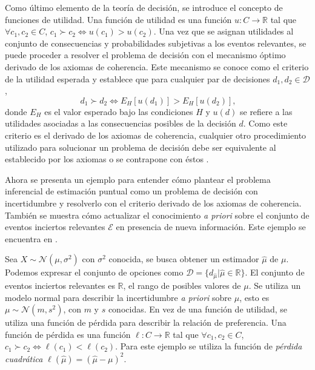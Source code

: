 \documentclass[11pt,a4paper]{article}
\begin{document}
Como último elemento de la teoría de decisión, se introduce el concepto de funciones de utilidad. Una función de utilidad es una función $u: C \to \mathbb{R}$ tal que $\forall c_1, c_2 \in C$, $c_1 \succ c_2 \iff u(c_1) > u(c_2)$. Una vez que se asignan utilidades al conjunto de consecuencias y probabilidades subjetivas a los eventos relevantes, se puede proceder a resolver el problema de decisión con el mecanismo óptimo derivado de los axiomas de coherencia. Este mecanismo se conoce como el criterio de la utilidad esperada y establece que para cualquier par de decisiones $d_1, d_2 \in \mathcal{D}$, $$ \ d_1 \succ d_2 \iff E_H[u(d_1)] > E_H[u(d_2)],$$ donde $E_H$ es el valor esperado bajo las condiciones $H$ y $u(d)$ se refiere a las utilidades asociadas a las consecuencias posibles de la decisión $d$. Como este criterio es el derivado de los axiomas de coherencia, cualquier otro procedimiento utilizado para solucionar un problema de decisión debe ser equivalente al establecido por los axiomas o se contrapone con éstos \citep{mendoza}.

Ahora se presenta un ejemplo para entender cómo plantear el problema inferencial de estimación puntual como un problema de decisión con incertidumbre y resolverlo con el criterio derivado de los axiomas de coherencia. También se muestra cómo actualizar el conocimiento \textit{a priori} sobre el conjunto de eventos inciertos relevantes $\mathcal{E}$ en presencia de nueva información. Este ejemplo se encuentra en \citet{mendoza}.

Sea $X \sim \mathcal{N}(\mu, \sigma^2)$ con $\sigma^2$ conocida, se busca obtener un estimador $\hat{\mu}$ de $\mu$. Podemos expresar el conjunto de opciones como $\mathcal{D} = \lbrace d_{\hat{\mu}} | \hat{\mu} \in \mathbb{R}\rbrace$. El conjunto de eventos inciertos relevantes es $\mathbb{R}$, el rango de posibles valores de $\mu$. Se utiliza un modelo normal para describir la incertidumbre \textit{a priori} sobre $\mu$, esto es $\mu \sim \mathcal{N}(m, s^2)$, con $m$ y $s$ conocidas. En vez de una función de utilidad, se utiliza una función de pérdida para describir la relación de preferencia. Una función de pérdida es una función $\ell : C \to \mathbb{R}$ tal que $\forall c_1, c_2 \in C$, $c_1 \succ c_2 \iff \ell (c_1) < \ell (c_2)$. Para este ejemplo se utiliza la función de \textit{pérdida cuadrática} $\ell (\hat{\mu}) = (\hat{\mu} - \mu)^2$. 
\end{document}
